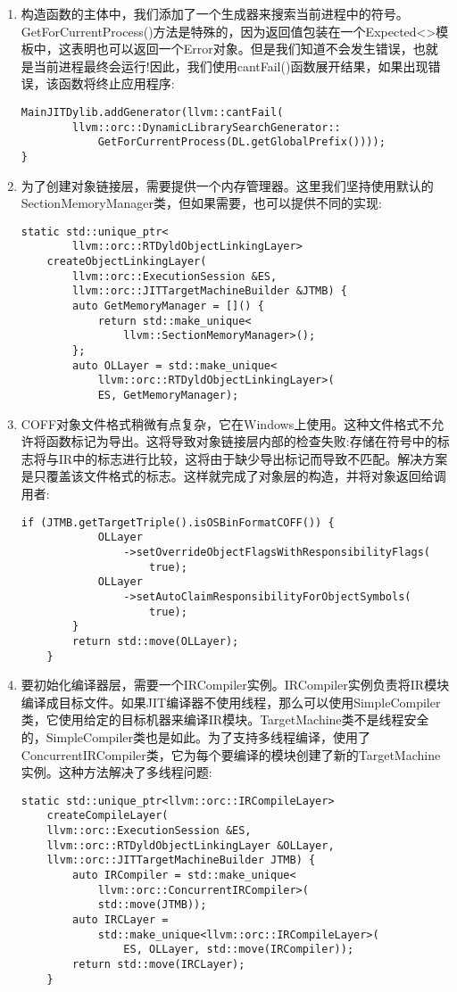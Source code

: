 \begin{enumerate}
\item 构造函数的主体中，我们添加了一个生成器来搜索当前进程中的符号。GetForCurrentProcess()方法是特殊的，因为返回值包装在一个Expected<>模板中，这表明也可以返回一个Error对象。但是我们知道不会发生错误，也就是当前进程最终会运行!因此，我们使用cantFail()函数展开结果，如果出现错误，该函数将终止应用程序:
\begin{lstlisting}[caption={}]
	MainJITDylib.addGenerator(llvm::cantFail(
		llvm::orc::DynamicLibrarySearchGenerator::
			GetForCurrentProcess(DL.getGlobalPrefix())));
}
\end{lstlisting}

\item 为了创建对象链接层，需要提供一个内存管理器。这里我们坚持使用默认的SectionMemoryManager类，但如果需要，也可以提供不同的实现:
\begin{lstlisting}[caption={}]
	static std::unique_ptr<
		llvm::orc::RTDyldObjectLinkingLayer>
	createObjectLinkingLayer(
		llvm::orc::ExecutionSession &ES,
		llvm::orc::JITTargetMachineBuilder &JTMB) {
		auto GetMemoryManager = []() {
			return std::make_unique<
				llvm::SectionMemoryManager>();
		};
		auto OLLayer = std::make_unique<
			llvm::orc::RTDyldObjectLinkingLayer>(
			ES, GetMemoryManager);
\end{lstlisting}

\item COFF对象文件格式稍微有点复杂，它在Windows上使用。这种文件格式不允许将函数标记为导出。这将导致对象链接层内部的检查失败:存储在符号中的标志将与IR中的标志进行比较，这将由于缺少导出标记而导致不匹配。解决方案是只覆盖该文件格式的标志。这样就完成了对象层的构造，并将对象返回给调用者:
\begin{lstlisting}[caption={}]
		if (JTMB.getTargetTriple().isOSBinFormatCOFF()) {
			OLLayer
				->setOverrideObjectFlagsWithResponsibilityFlags(
					true);
			OLLayer
				->setAutoClaimResponsibilityForObjectSymbols(
					true);
		}
		return std::move(OLLayer);
	}
\end{lstlisting}

\item 要初始化编译器层，需要一个IRCompiler实例。IRCompiler实例负责将IR模块编译成目标文件。如果JIT编译器不使用线程，那么可以使用SimpleCompiler类，它使用给定的目标机器来编译IR模块。TargetMachine类不是线程安全的，SimpleCompiler类也是如此。为了支持多线程编译，使用了ConcurrentIRCompiler类，它为每个要编译的模块创建了新的TargetMachine实例。这种方法解决了多线程问题:
\begin{lstlisting}[caption={}]
	static std::unique_ptr<llvm::orc::IRCompileLayer>
	createCompileLayer(
	llvm::orc::ExecutionSession &ES,
	llvm::orc::RTDyldObjectLinkingLayer &OLLayer,
	llvm::orc::JITTargetMachineBuilder JTMB) {
		auto IRCompiler = std::make_unique<
			llvm::orc::ConcurrentIRCompiler>(
			std::move(JTMB));
		auto IRCLayer =
			std::make_unique<llvm::orc::IRCompileLayer>(
				ES, OLLayer, std::move(IRCompiler));
		return std::move(IRCLayer);
	}
\end{lstlisting}


\end{enumerate}
